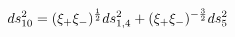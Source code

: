 \begin{equation}
ds_{10}^2 = (\xi_+ \xi_-)^{1 \over 2} ds_{1,4}^2+
(\xi_+ \xi_-)^{-{3 \over 2}}  ds_{5}^2
\end{equation}

